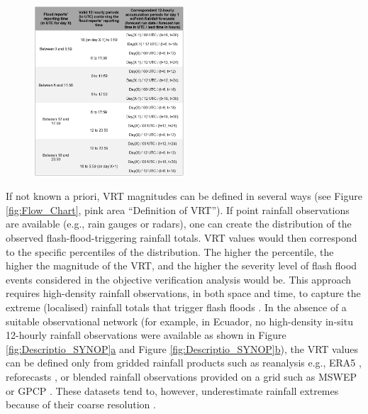 \documentclass[techmemo]{ecmwfrep}%
\begin{document}
\begin{figure}
\centering
{}
\includegraphics[width=0.5\textwidth]{Tables/02_FC_ProxyOBS.png}
\label{table:FC_ProxyOBS}
\end{figure}

If not known a priori, VRT magnitudes can be defined in several ways (see Figure \ref{fig:Flow_Chart}, pink area “Definition of VRT”). If point rainfall observations are available (e.g., rain gauges or radars), one can create the distribution of the observed flash-flood-triggering rainfall totals. VRT values would then correspond to the specific percentiles of the distribution. The higher the percentile, the higher the magnitude of the VRT, and the higher the severity level of flash flood events considered in the objective verification analysis would be. This approach requires high-density rainfall observations, in both space and time, to capture the extreme (localised) rainfall totals that trigger flash floods \citep{Haiden2016, RamosFilho2021}. In the absence of a suitable observational network (for example, in Ecuador, no high-density in-situ 12-hourly rainfall observations were available as shown in Figure \ref{fig:Descriptio_SYNOP}\hyperref[fig:Descriptio_SYNOP]{a} and Figure \ref{fig:Descriptio_SYNOP}\hyperref[fig:Descriptio_SYNOP]{b}), the VRT values can be defined only from gridded rainfall products such as reanalysis e.g., ERA5 \citep{Hersbach2020}, reforecasts \citep{Hamill2006}, or blended rainfall observations provided on a grid such as MSWEP \citep{Beck2019} or GPCP \citep{Adler2018}. These datasets tend to, however, underestimate rainfall extremes because of their coarse resolution \citep{Tapiador2019a}.
\end{document}
